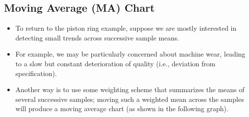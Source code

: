 \documentclass[MASTER-SPC.tex]{subfiles}
\begin{document}
\newpage
\subsection{Moving Average (MA) Chart}

\begin{itemize}
\item To return to the piston ring example, suppose we are mostly interested in detecting small trends across successive sample means. 
\item For example, we may be particularly concerned about machine wear, leading to a slow but constant deterioration of quality (i.e., deviation from specification). 

\item Another way is to use some weighting scheme that summarizes the means of several successive samples; moving such a weighted mean across the samples will produce a moving average chart (as shown in the following graph).
\end{itemize}
%
%
%
\newpage
\end{document}
